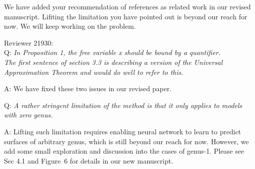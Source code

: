 \documentclass[10pt]{letter} %
\begin{document}
	We have added your recommendation of references as related work in our revised manuscript. Lifiting the limitation you have pointed out is beyond our reach for now. We will keep working on the problem.
	  
	
	\hdashrule{\linewidth}{1pt}{1mm}
	Reviewer 21930:\\
	
	Q: \emph{In Proposition 1, the free variable x should be bound by a quantifier.
		\\The first sentence of section 3.3 is describing a version of the Universal Approximation Theorem and would do well to refer to this.}
	
	A: We have fixed these two issues in our revised paper.
	
	Q:\emph{ A rather stringent limitation of the method is that it only applies to models with zero genus.}
	
	A: Lifting such limitation requires enabling neural network to learn to predict surfaces of arbitrary genus, which is still beyond our reach for now. However, we add some small exploration and discussion into the cases of genus-1. Please see Sec 4.1 and Figure~6 for details in our new manuscript. 

	
\end{document}
